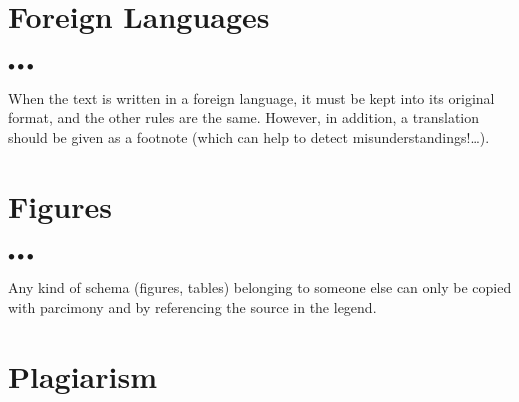 \documentclass[11pt, english, screen, research-development]{report-rd-info}
\newenvironment{explanation}
{\color{blue}
 \begin{list}{}{\hspace{0.2\textwidth}\color{blue}}\item $\bullet\bullet\bullet$
}
{\end{list}}
\begin{document}
\section{Foreign Languages}

\begin{explanation}
   When the text is written in a foreign language, it must be kept into its original format, and the other rules are the same.
   However, in addition, a translation should be given as a footnote (which can help to detect misunderstandings!\ldots).
\end{explanation}

\section{Figures}

\begin{explanation}
   Any kind of schema (figures, tables) belonging to someone else can only be copied with parcimony and by referencing the source in the legend.
\end{explanation}

\section{Plagiarism}
\label{ann:Plagiarism}
\end{document}
